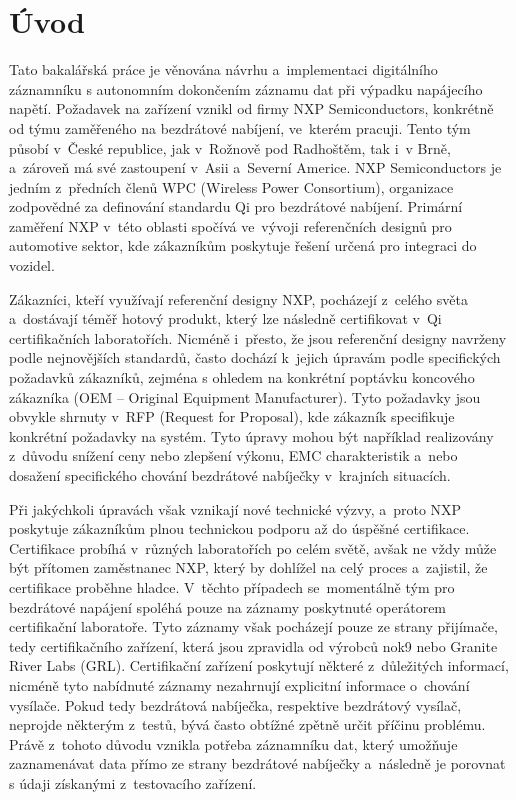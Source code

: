 
%

\chapter{Úvod}
\label{uvod}
Tato bakalářská práce je věnována návrhu a~implementaci digitálního záznamníku s autonomním dokončením záznamu dat při výpadku napájecího napětí. Požadavek na zařízení vznikl od firmy NXP Semiconductors, konkrétně od týmu zaměřeného na bezdrátové nabíjení, ve~kterém pracuji. Tento tým působí v~České republice, jak v~Rožnově pod Radhoštěm, tak i~v Brně, a~zároveň má své zastoupení v~Asii a~Severní Americe. NXP Semiconductors je jedním z~předních členů WPC (Wireless Power Consortium), organizace zodpovědné za definování standardu Qi pro bezdrátové nabíjení. Primární zaměření NXP v~této oblasti spočívá ve~vývoji referenčních designů pro automotive sektor, kde zákazníkům poskytuje řešení určená pro integraci do vozidel.

Zákazníci, kteří využívají referenční designy NXP, pocházejí z~celého světa a~dostávají téměř hotový produkt, který lze následně certifikovat v~Qi certifikačních laboratořích. Nicméně i~přesto, že jsou referenční designy navrženy podle nejnovějších standardů, často dochází k~jejich úpravám podle specifických požadavků zákazníků, zejména s ohledem na konkrétní poptávku koncového zákazníka (OEM -- Original Equipment Manufacturer). Tyto požadavky jsou obvykle shrnuty v~RFP (Request for Proposal), kde zákazník specifikuje konkrétní požadavky na systém. Tyto úpravy mohou být například realizovány z~důvodu snížení ceny nebo zlepšení výkonu, EMC charakteristik a~nebo dosažení specifického chování bezdrátové nabíječky v~krajních situacích. 

Při jakýchkoli úpravách však vznikají nové technické výzvy, a~proto NXP poskytuje zákazníkům plnou technickou podporu až do úspěšné certifikace. Certifikace probíhá v~různých laboratořích po celém světě, avšak ne vždy může být přítomen zaměstnanec NXP, který by dohlížel na celý proces a~zajistil, že certifikace proběhne hladce. V~těchto případech se~momentálně tým pro bezdrátové napájení spoléhá pouze na záznamy poskytnuté operátorem certifikační laboratoře. Tyto záznamy však pocházejí pouze ze strany přijímače, tedy certifikačního zařízení, která jsou zpravidla od výrobců nok9 nebo Granite River Labs (GRL). Certifikační zařízení poskytují některé z~důležitých informací, nicméně tyto nabídnuté záznamy nezahrnují explicitní informace o~chování vysílače. Pokud tedy bezdrátová nabíječka, respektive bezdrátový vysílač, neprojde některým z~testů, bývá často obtížné zpětně určit příčinu problému. Právě z~tohoto důvodu vznikla potřeba záznamníku dat, který umožňuje zaznamenávat data přímo ze strany bezdrátové nabíječky a~následně je porovnat s údaji získanými z~testovacího zařízení.

